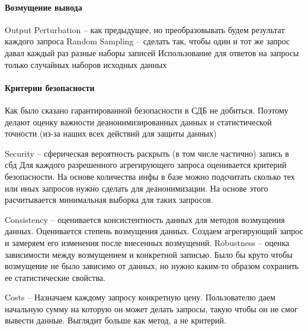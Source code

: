 \paragraph{Возмущение вывода}

Output Perturbation -- как предыдущее, но преобразовывать будем результат каждого запроса
Random Sampling -- сделать так, чтобы один и тот же запрос давал каждый раз разные наборы записей
Использование для ответов на запросы только случайных наборов исходных данных

\paragraph{Критерии безопасности}
Как было сказано гарантированной безопасности в СДБ не добиться. Поэтому делают оценку важности деанонимизированных данных и статистической точности (из-за наших всех действий для защиты данных)

Security -- сферическая вероятность раскрыть (в том числе частично) запись в сбд
Для каждого разрешенного агрегирующего запроса оценивается критерий безопасности. На основе количества инфы в базе можно подсчитать сколько тех или иных запросов нужно сделать для деанонимизации. На основе этого расчитывается минимальная выборка для таких запросов.

Consistency -- оценивается консистентность данных для методов возмущения данных. Оценивается степень возмущения данных. Создаем агрегирующий запрос и замеряем его изменения после внесенных возмущений.
Robustness -- оценка зависимости между возмущением и конкретной записью. Было бы круто чтобы возмущение не было зависимо от данных, но нужно каким-то образом сохранить ее статистические свойства.

Costs -- Назначаем каждому запросу конкретную цену. Пользователю даем начальную сумму на которую он может делать запросы, такую чтобы он не смог вывести данные. Выглядит больше как метод, а не критерий.

